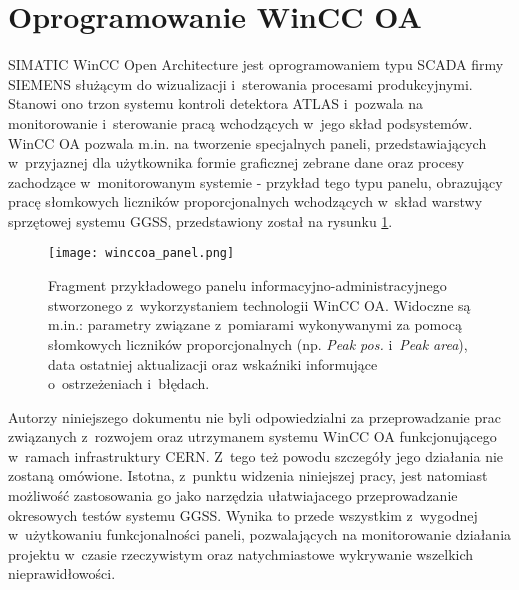 \section{Oprogramowanie WinCC OA}
SIMATIC WinCC Open Architecture jest oprogramowaniem typu SCADA firmy SIEMENS służącym do wizualizacji i~sterowania procesami produkcyjnymi. Stanowi ono trzon systemu kontroli detektora ATLAS i~pozwala na monitorowanie i~sterowanie pracą wchodzących w~jego skład podsystemów. WinCC OA pozwala m.in. na tworzenie specjalnych paneli, przedstawiających w~przyjaznej dla użytkownika formie graficznej zebrane dane oraz procesy zachodzące w~monitorowanym systemie - przykład tego typu panelu, obrazujący pracę słomkowych liczników proporcjonalnych wchodzących w~skład warstwy sprzętowej systemu GGSS, przedstawiony został na rysunku \ref{fig:winccoa_panel_example}.

\begin{figure}[H]
\centering
\texttt{[image: winccoa\_panel.png]}
\caption{Fragment przykładowego panelu informacyjno-administracyjnego stworzonego z~wykorzystaniem technologii WinCC OA. Widoczne są m.in.: parametry związane z~pomiarami wykonywanymi za pomocą słomkowych liczników proporcjonalnych (np. \emph{Peak pos.} i~\emph{Peak area}), data ostatniej aktualizacji oraz wskaźniki informujące o~ostrzeżeniach i~błędach.}
\label{fig:winccoa_panel_example}
\end{figure}


Autorzy niniejszego dokumentu nie byli odpowiedzialni za przeprowadzanie prac związanych z~rozwojem oraz utrzymanem systemu WinCC OA funkcjonującego w~ramach infrastruktury CERN. Z~tego też powodu szczegóły jego działania nie zostaną omówione. Istotna, z~punktu widzenia niniejszej pracy, jest natomiast możliwość zastosowania go jako narzędzia ułatwiajacego przeprowadzanie okresowych testów systemu GGSS. Wynika to przede wszystkim z~wygodnej w~użytkowaniu funkcjonalności paneli, pozwalających na monitorowanie działania projektu w~czasie rzeczywistym oraz natychmiastowe wykrywanie wszelkich nieprawidłowości. 


